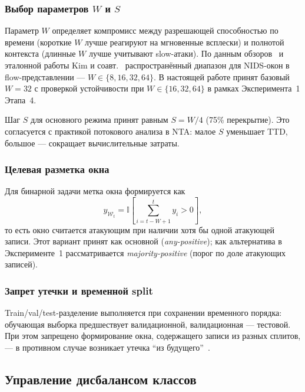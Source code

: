 \subsubsection{Выбор параметров \texorpdfstring{$W$ и $S$}{W и S}}

Параметр \(W\) определяет компромисс между разрешающей способностью по
времени (короткие \(W\) лучше реагируют на мгновенные всплески) и
полнотой контекста (длинные \(W\) лучше учитывают slow-атаки). По данным
обзоров~\cite{vinayakumar2019dl, ferrag2020dlcyber, ahmad2021nids}
и эталонной работы Kim и соавт.~\cite{kim2016lstm} распространённый диапазон
для NIDS-окон в flow-представлении --- \(W \in \{8, 16, 32, 64\}\).
В настоящей работе принят базовый \(W = 32\) с проверкой устойчивости при
\(W \in \{16, 32, 64\}\) в рамках Эксперимента~1 Этапа~4.

Шаг \(S\) для основного режима принят равным \(S = W/4\) (75\% перекрытие).
Это согласуется с практикой потокового анализа в NTA: малое \(S\) уменьшает
TTD, большое --- сокращает вычислительные затраты.

\subsubsection{Целевая разметка окна}

Для бинарной задачи метка окна формируется как
\begin{equation}
y_{\mathcal{W}_t} =
\mathbb{I}\!\left[\sum_{i=t-W+1}^{t} y_i > 0\right],
\label{eq:window-label}
\end{equation}
то есть окно считается атакующим при наличии хотя бы одной атакующей
записи. Этот вариант принят как основной (\emph{any-positive}); как
альтернатива в Эксперименте~1 рассматривается \emph{majority-positive}
(порог по доле атакующих записей).

\subsubsection{Запрет утечки и временной split}

Train/val/test-разделение выполняется при сохранении временного порядка:
обучающая выборка предшествует валидационной, валидационная ---
тестовой. При этом запрещено формирование окна, содержащего записи из
разных сплитов, --- в противном случае возникает утечка
``из будущего''~\cite{pendlebury2019tesseract}.

\subsection{Управление дисбалансом классов}

